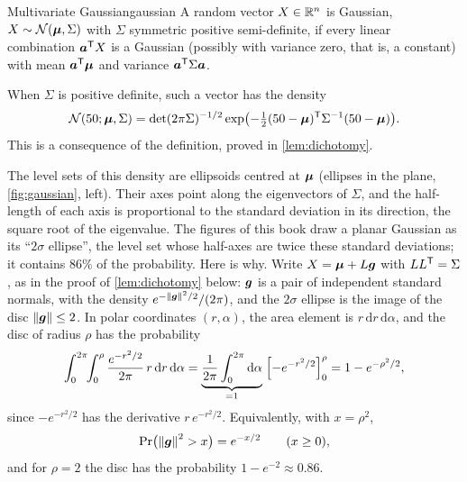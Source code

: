 \begin{definition}{Multivariate Gaussian}{gaussian}
A random vector $X\in\mathbb{R}^n$ is Gaussian, $X\sim\mathcal{N}(\bm{\mu},\Sigma)$ with
$\Sigma$ symmetric positive semi-definite, if every linear combination
$\bm{a}^{\mathsf{T}} X$ is a Gaussian (possibly with variance zero, that is, a
constant) with mean
$\bm{a}^{\mathsf{T}}\bm{\mu}$ and variance $\bm{a}^{\mathsf{T}}\Sigma\bm{a}$.
\end{definition}

When $\Sigma$ is positive definite, such a vector has the density
\begin{equation}\label{eq:gaussdensity}
  \mathcal{N}(50;\bm{\mu},\Sigma)=\det(2\pi\Sigma)^{-1/2}
  \exp\bigl(-\tfrac12(50-\bm{\mu})^{\mathsf{T}}\Sigma^{-1}(50-\bm{\mu})\bigr).
\end{equation}
This is a consequence of the definition, proved in \cref{lem:dichotomy}.

The level sets of this density are ellipsoids centred at $\bm{\mu}$
(ellipses in the plane, \cref{fig:gaussian}, left). Their axes point along
the eigenvectors of $\Sigma$, and the half-length of each axis is
proportional to the standard deviation in its direction, the square root
of the eigenvalue. The figures of this book draw a planar Gaussian as its
``$2\sigma$ ellipse'', the level set whose half-axes are twice these
standard deviations; it contains $86\%$ of the probability. Here is
why. Write $X=\bm{\mu}+L\bm{g}$ with $LL^{\mathsf{T}}=\Sigma$, as in the proof of
\cref{lem:dichotomy} below: $\bm{g}$ is a pair of independent standard
normals, with the density $e^{-\left\lVert \bm{g}\right\rVert^2/2}/(2\pi)$, and the
$2\sigma$ ellipse is the image of the disc $\left\lVert \bm{g}\right\rVert\le2$. In polar
coordinates $(r,\alpha)$, the area element is $r\,\mathrm dr\,\mathrm
d\alpha$, and the disc of radius $\rho$ has the probability
\[
  \int_0^{2\pi}\!\!\int_0^\rho\frac{e^{-r^2/2}}{2\pi}\,r\,\mathrm dr\,
  \mathrm d\alpha
  =\underbrace{\frac{1}{2\pi}\int_0^{2\pi}\mathrm d\alpha}_{=1}\;
   \Bigl[-e^{-r^2/2}\Bigr]_0^\rho
  =1-e^{-\rho^2/2},
\]
since $-e^{-r^2/2}$ has the derivative $r\,e^{-r^2/2}$. Equivalently,
with $x=\rho^2$,
\begin{equation}\label{eq:chi2tail}
  \Pr\bigl(\left\lVert \bm{g}\right\rVert^2>x\bigr)=e^{-x/2}\qquad(x\ge0),
\end{equation}
and for $\rho=2$ the disc has the probability $1-e^{-2}\approx0.86$.

